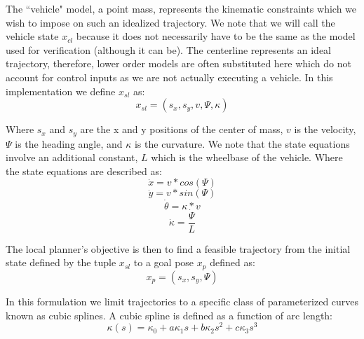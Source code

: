 \documentclass{easychair}
\theoremstyle{theorem}
\theoremstyle{remark}
\begin{document}
The ``vehicle" model, a point mass, represents the kinematic constraints which we wish to impose on such an idealized trajectory. We note that we will call the vehicle state $x_{cl}$ because it does not necessarily have to be the same as the model used for verification (although it can be). The centerline represents an ideal trajectory, therefore, lower order models are often substituted here which do not account for control inputs as we are not actually executing a vehicle. In this implementation we define $x_{sl}$ as:
\begin{equation}
x_{sl}=(s_x, s_y, v, \Psi, \kappa)
\end{equation}

Where $s_x$ and $s_y$ are the x and y positions of the center of mass, $v$ is the velocity, $\Psi$ is the heading angle, and $\kappa$ is the curvature. We note that the state equations involve an additional constant, $L$ which is the wheelbase of the vehicle.
Where the state equations are described as:
\begin{equation}
\dot{x}= v*cos(\Psi)
\end{equation}
\begin{equation}
\dot{y} = v*sin(\Psi)
\end{equation}
\begin{equation}
\dot{\theta}= \kappa*v
\end{equation}
\begin{equation}
\dot{\kappa} = \frac{\dot{\Psi}}{L}
\end{equation}

The local planner's objective is then to find a feasible trajectory from the initial state defined by the tuple $x_{sl}$ to a goal pose $x_{p}$ defined as:
\begin{equation}
x_{p} = (s_x,s_y,\Psi)
\end{equation}

In this formulation we limit trajectories to a specific class of parameterized curves known as cubic splines. A cubic spline is defined as a function of arc length:
\begin{equation}
\kappa(s) = \kappa_0 + a \kappa_1 s + b \kappa_2 s^2 + c \kappa_3 s^3
\end{equation}
\end{document}
